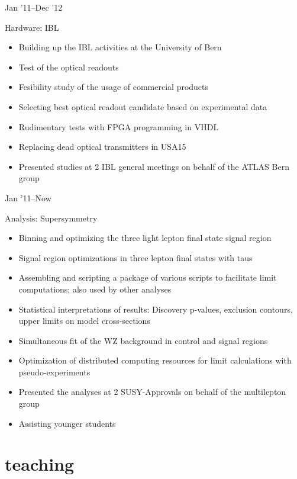\documentclass[]{cv} %
\begin{document}
\begin{entrylist}

  \entry
  {Jan '11--Dec '12}
  {Hardware: IBL{\normalfont
    \begin{itemize}
      \item Building up the IBL activities at the University of Bern
      \item Test of the optical readouts
      \item Fesibility study of the usage of commercial products
      \item Selecting best optical readout candidate based on experimental data
      \item Rudimentary tests with FPGA programming in VHDL
      \item Replacing dead optical transmitters in USA15
      \item Presented studies at 2 IBL general meetings on behalf of the ATLAS Bern group
  \end{itemize}}}
  {}
  {\vspace*{-22pt}}

\entry
{Jan '11--Now}
{Analysis: Supersymmetry{\normalfont
  \begin{itemize}
  \item Binning and optimizing the three light lepton final state signal region
  \item Signal region optimizations in three lepton final states with taus
  \item Assembling and scripting a package of various scripts to facilitate limit computations; also used by other analyses
  \item Statistical interpretations of results: Discovery p-values, exclusion contours, upper limits on model cross-sections
  \item Simultaneous fit of the WZ background in control and signal regions
  \item Optimization of distributed computing resources for limit calculations with pseudo-experiments
  \item Presented the analyses at 2 SUSY-Approvals on behalf of the multilepton group
  \item Assisting younger students
\end{itemize}}}
{}
  {\vspace*{-22pt}}

\end{entrylist}

\newpage

\section{teaching}
\end{document}
